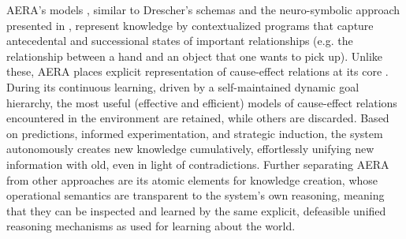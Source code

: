 \documentclass[runningheads]{llncs}
\begin{document}
	

AERA’s models \cite{thorisson2019cumulative,thorisson2014autonomous,nivel2013autocatalytic}, similar to Drescher’s schemas \cite{drescher_made-up_1991} and the neuro-symbolic approach presented in \cite{komrusch_symbolic_2022}, represent knowledge by contextualized programs that capture antecedental and successional states of important relationships (e.g. the relationship between a hand and an object that one wants to pick up). 
Unlike these, AERA places explicit representation of cause-effect relations at its core \cite{thorisson2018cumulative}. 
During its continuous learning, driven by a self-maintained dynamic goal hierarchy, the most useful (effective and efficient) models of cause-effect relations encountered in the environment are retained, while others are discarded. 
Based on predictions, informed experimentation, and strategic induction, the system autonomously creates new knowledge cumulatively, effortlessly unifying new information with old, even in light of contradictions. Further separating AERA from other approaches are its atomic elements for knowledge creation, whose operational semantics are transparent to the system’s own reasoning, meaning that they can be inspected and learned by the same explicit, defeasible unified reasoning mechanisms as used for learning about the world. 

\end{document}
